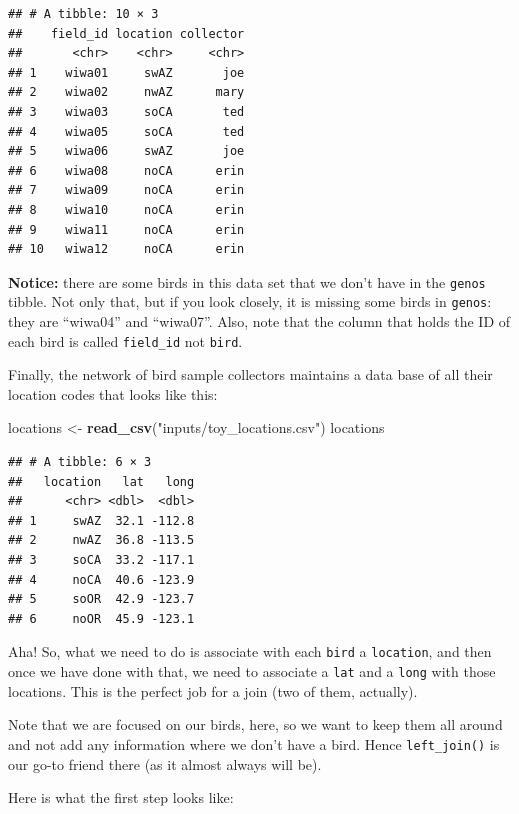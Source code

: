\documentclass[]{book}
\newenvironment{Shaded}{\begin{snugshade}}{\end{snugshade}}
\newcommand{\KeywordTok}[1]{\textcolor[rgb]{0.13,0.29,0.53}{\textbf{{#1}}}}
\newcommand{\DataTypeTok}[1]{\textcolor[rgb]{0.13,0.29,0.53}{{#1}}}
\newcommand{\StringTok}[1]{\textcolor[rgb]{0.31,0.60,0.02}{{#1}}}
\newcommand{\NormalTok}[1]{{#1}}
\theoremstyle{definition}
\theoremstyle{definition}
\theoremstyle{remark}
\begin{document}
\begin{verbatim}
## # A tibble: 10 × 3
##    field_id location collector
##       <chr>    <chr>     <chr>
## 1    wiwa01     swAZ       joe
## 2    wiwa02     nwAZ      mary
## 3    wiwa03     soCA       ted
## 4    wiwa05     soCA       ted
## 5    wiwa06     swAZ       joe
## 6    wiwa08     noCA      erin
## 7    wiwa09     noCA      erin
## 8    wiwa10     noCA      erin
## 9    wiwa11     noCA      erin
## 10   wiwa12     noCA      erin
\end{verbatim}

\textbf{Notice:} there are some birds in this data set that we don't
have in the \texttt{genos} tibble. Not only that, but if you look
closely, it is missing some birds in \texttt{genos}: they are ``wiwa04''
and ``wiwa07''. Also, note that the column that holds the ID of each
bird is called \texttt{field\_id} not \texttt{bird}.

Finally, the network of bird sample collectors maintains a data base of
all their location codes that looks like this:

\begin{Shaded}
\begin{Highlighting}[]
\NormalTok{locations <-}\StringTok{ }\KeywordTok{read_csv}\NormalTok{(}\StringTok{"inputs/toy_locations.csv"}\NormalTok{)}
\NormalTok{locations}
\end{Highlighting}
\end{Shaded}

\begin{verbatim}
## # A tibble: 6 × 3
##   location   lat   long
##      <chr> <dbl>  <dbl>
## 1     swAZ  32.1 -112.8
## 2     nwAZ  36.8 -113.5
## 3     soCA  33.2 -117.1
## 4     noCA  40.6 -123.9
## 5     soOR  42.9 -123.7
## 6     noOR  45.9 -123.1
\end{verbatim}

Aha! So, what we need to do is associate with each \texttt{bird} a
\texttt{location}, and then once we have done with that, we need to
associate a \texttt{lat} and a \texttt{long} with those locations. This
is the perfect job for a join (two of them, actually).

Note that we are focused on our birds, here, so we want to keep them all
around and not add any information where we don't have a bird. Hence
\texttt{left\_join()} is our go-to friend there (as it almost always
will be).

Here is what the first step looks like:

\begin{Shaded}
\end{Shaded}
\end{document}
